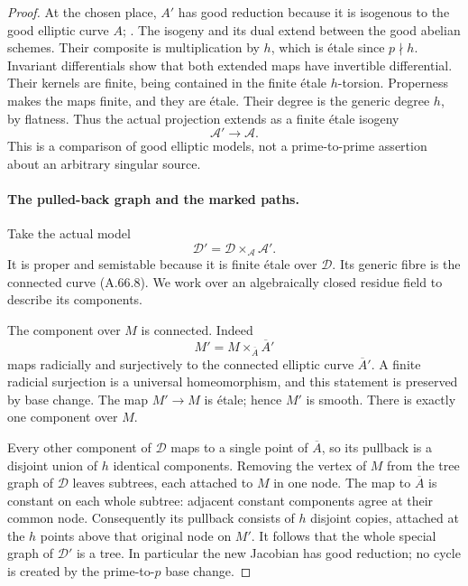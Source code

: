 \begin{proof}
At the chosen place, \(A'\) has good reduction because it is
isogenous to the good elliptic curve \(A\);
\cite[Theorem 1 and Corollary 2, p.~493]{fghSerreTate1968}.
The isogeny and its dual extend between the good abelian
schemes. Their composite is multiplication by \(h\), which
is étale since \(p\nmid h\). Invariant differentials show
that both extended maps have invertible differential.
Their kernels are finite, being contained in the
finite étale \(h\)-torsion. Properness makes the maps
finite, and they are étale. Their degree is the generic
degree \(h\), by flatness. Thus the actual projection
extends as a finite étale isogeny
\[
                    \mathcal A'\longrightarrow\mathcal A .
                                                               \tag{A.66.9}
\]
This is a comparison of good elliptic models, not a
prime-to-prime assertion about an arbitrary singular source.

\paragraph{The pulled-back graph and the marked paths.}
Take the actual model
\[
              \mathcal D'=\mathcal D
                              \times_{\mathcal A}\mathcal A'.
                                                               \tag{A.66.10}
\]
It is proper and semistable because it is finite étale
over \(\mathcal D\). Its generic fibre is the connected
curve (A.66.8). We work over an algebraically closed
residue field to describe its components.

The component over \(M\) is connected. Indeed
\[
                   M'=M\times_{\overline A}\overline A'
\]
maps radicially and surjectively to the connected elliptic
curve \(\overline A'\). A finite radicial surjection is a
universal homeomorphism, and this statement is preserved
by base change. The map \(M'\to M\) is étale; hence
\(M'\) is smooth. There is exactly one component over \(M\).

Every other component of \(\mathcal D\) maps to a single
point of \(\overline A\), so its pullback is a disjoint
union of \(h\) identical components. Removing the vertex
of \(M\) from the tree graph of \(\mathcal D\) leaves
subtrees, each attached to \(M\) in one node. The map to
\(\overline A\) is constant on each whole subtree: adjacent
constant components agree at their common node.
Consequently its pullback consists of \(h\) disjoint
copies, attached at the \(h\) points above that original
node on \(M'\). It follows that the whole special graph
of \(\mathcal D'\) is a tree. In particular the new
Jacobian has good reduction; no cycle is created by the
prime-to-\(p\) base change.


\end{proof}
